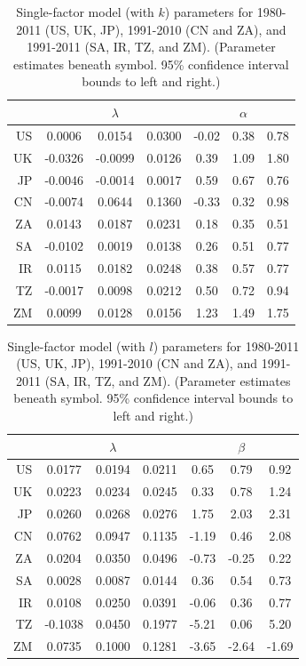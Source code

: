\documentclass[preprint,authoryear,12pt]{elsarticle}\usepackage{graphicx, color}
\begin{document}
\begin{table}[H]
\begin{center}
\caption{Single-factor model (with $k$) parameters for 1980-2011 (US, UK, JP), 1991-2010 (CN and ZA), and 1991-2011 (SA, IR, TZ, and ZM). (Parameter estimates beneath symbol. 95\% confidence interval bounds to left and right.)}
\label{tab:SF_Parameters_With_K}
{\tiny
\begin{tabular}{r|ccc|ccc}
  \hline
 &   & $\lambda$ &   &   & $\alpha$ &   \\ 
  \hline
US & 0.0006 & 0.0154 & 0.0300 & -0.02 & 0.38 & 0.78 \\ 
  UK & -0.0326 & -0.0099 & 0.0126 & 0.39 & 1.09 & 1.80 \\ 
  JP & -0.0046 & -0.0014 & 0.0017 & 0.59 & 0.67 & 0.76 \\ 
  CN & -0.0074 & 0.0644 & 0.1360 & -0.33 & 0.32 & 0.98 \\ 
  ZA & 0.0143 & 0.0187 & 0.0231 & 0.18 & 0.35 & 0.51 \\ 
  SA & -0.0102 & 0.0019 & 0.0138 & 0.26 & 0.51 & 0.77 \\ 
  IR & 0.0115 & 0.0182 & 0.0248 & 0.38 & 0.57 & 0.77 \\ 
  TZ & -0.0017 & 0.0098 & 0.0212 & 0.50 & 0.72 & 0.94 \\ 
  ZM & 0.0099 & 0.0128 & 0.0156 & 1.23 & 1.49 & 1.75 \\ 
   \hline
\end{tabular}
}
\end{center}
\end{table}
\begin{table}[H]
\begin{center}
\caption{Single-factor model (with $l$) parameters for 1980-2011 (US, UK, JP), 1991-2010 (CN and ZA), and 1991-2011 (SA, IR, TZ, and ZM). (Parameter estimates beneath symbol. 95\% confidence interval bounds to left and right.)}
\label{tab:SF_Parameters_With_L}
{\tiny
\begin{tabular}{r|ccc|ccc}
  \hline
 &   & $\lambda$ &   &   & $\beta$ &   \\ 
  \hline
US & 0.0177 & 0.0194 & 0.0211 & 0.65 & 0.79 & 0.92 \\ 
  UK & 0.0223 & 0.0234 & 0.0245 & 0.33 & 0.78 & 1.24 \\ 
  JP & 0.0260 & 0.0268 & 0.0276 & 1.75 & 2.03 & 2.31 \\ 
  CN & 0.0762 & 0.0947 & 0.1135 & -1.19 & 0.46 & 2.08 \\ 
  ZA & 0.0204 & 0.0350 & 0.0496 & -0.73 & -0.25 & 0.22 \\ 
  SA & 0.0028 & 0.0087 & 0.0144 & 0.36 & 0.54 & 0.73 \\ 
  IR & 0.0108 & 0.0250 & 0.0391 & -0.06 & 0.36 & 0.77 \\ 
  TZ & -0.1038 & 0.0450 & 0.1977 & -5.21 & 0.06 & 5.20 \\ 
  ZM & 0.0735 & 0.1000 & 0.1281 & -3.65 & -2.64 & -1.69 \\ 
   \hline
\end{tabular}
}
\end{center}
\end{table}
\end{document}
